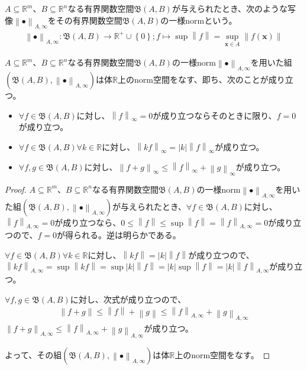 \documentclass[dvipdfmx]{jsarticle}
\begin{document}
\begin{dfn}
$A \subseteq \mathbb{R}^{m}$、$B \subseteq \mathbb{R}^{n}$なる有界関数空間$\mathfrak{B}(A,B)$が与えられたとき、次のような写像$\left\| \bullet \right\|_{A,\infty}$をその有界関数空間$\mathfrak{B}(A,B)$の一様normという。
\begin{align*}
\left\| \bullet \right\|_{A,\infty}\mathfrak{:B}(A,B) \rightarrow \mathbb{R}^{+} \cup \left\{ 0 \right\};f \mapsto \sup\left\| f \right\| = \sup_{\mathbf{x} \in A}\left\| f\left( \mathbf{x} \right) \right\|
\end{align*}
\end{dfn}
\begin{thm}\label{4.1.11.2}
$A \subseteq \mathbb{R}^{m}$、$B \subseteq \mathbb{R}^{n}$なる有界関数空間$\mathfrak{B}(A,B)$の一様norm$\left\| \bullet \right\|_{A,\infty}$を用いた組$\left( \mathfrak{B}(A,B),\left\| \bullet \right\|_{A,\infty} \right)$は体$\mathbb{R}$上のnorm空間をなす、即ち、次のことが成り立つ。
\begin{itemize}
\item
  $\forall f \in \mathfrak{B}(A,B)$に対し、$\left\| f \right\|_{\infty} = 0$が成り立つならそのときに限り、$f = 0$が成り立つ。
\item
  $\forall f \in \mathfrak{B}(A,B)\forall k \in \mathbb{R}$に対し、$\left\| kf \right\|_{\infty} = |k|\left\| f \right\|_{\infty}$が成り立つ。
\item
  $\forall f,g \in \mathfrak{B}(A,B)$に対し、$\left\| f + g \right\|_{\infty} \leq \left\| f \right\|_{\infty} + \left\| g \right\|_{\infty}$が成り立つ。
\end{itemize}
\end{thm}
\begin{proof}
$A \subseteq \mathbb{R}^{m}$、$B \subseteq \mathbb{R}^{n}$なる有界関数空間$\mathfrak{B}(A,B)$の一様norm$\left\| \bullet \right\|_{A,\infty}$を用いた組$\left( \mathfrak{B}(A,B),\left\| \bullet \right\|_{A,\infty} \right)$が与えられたとき、$\forall f \in \mathfrak{B}(A,B)$に対し、$\left\| f \right\|_{A,\infty} = 0$が成り立つなら、$0 \leq \left\| f \right\| \leq \sup\left\| f \right\| = \left\| f \right\|_{A,\infty} = 0$が成り立つので、$f = 0$が得られる。逆は明らかである。\par
$\forall f \in \mathfrak{B}(A,B)\forall k \in \mathbb{R}$に対し、$\left\| kf \right\| = |k|\left\| f \right\|$が成り立つので、$\left\| kf \right\|_{A,\infty} = \sup\left\| kf \right\| = \sup{|k|\left\| f \right\|} = |k|\sup\left\| f \right\| = |k|\left\| f \right\|_{A,\infty}$が成り立つ。\par
$\forall f,g \in \mathfrak{B}(A,B)$に対し、次式が成り立つので、
\begin{align*}
\left\| f + g \right\| \leq \left\| f \right\| + \left\| g \right\| \leq \left\| f \right\|_{A,\infty} + \left\| g \right\|_{A,\infty}
\end{align*}
$\left\| f + g \right\|_{A,\infty} \leq \left\| f \right\|_{A,\infty} + \left\| g \right\|_{A,\infty}$が成り立つ。\par
よって、その組$\left( \mathfrak{B}(A,B),\left\| \bullet \right\|_{A,\infty} \right)$は体$\mathbb{R}$上のnorm空間をなす。
\end{proof}
\end{document}
